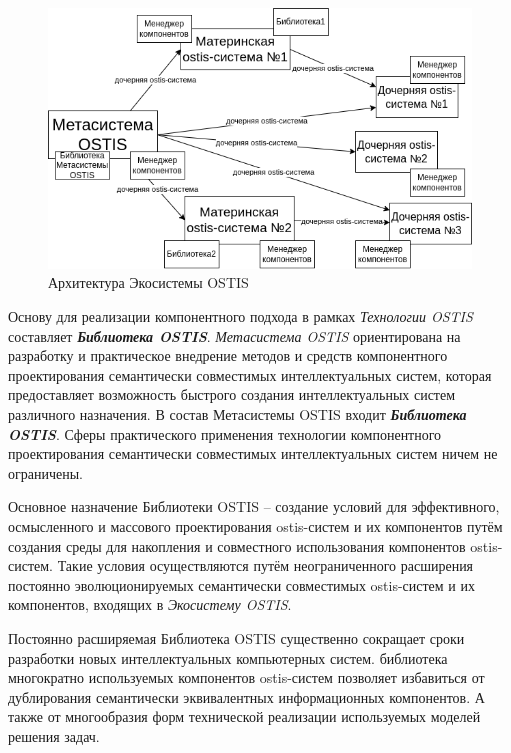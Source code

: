 \begin{figure}[H]
	\includegraphics[scale=0.8]{author/part5/figures/ecosystem_architecture.png}
	\caption{Архитектура Экосистемы OSTIS}
	\label{fig:ecosystem_architecture}
\end{figure}

Основу для реализации компонентного подхода в рамках \textit{Технологии OSTIS} составляет \textbf{\textit{Библиотека OSTIS}}. \textit{Метасистема OSTIS} ориентирована на разработку и практическое внедрение методов и средств компонентного проектирования семантически совместимых интеллектуальных систем, которая предоставляет возможность быстрого создания интеллектуальных систем различного назначения. В состав Метасистемы OSTIS входит \textbf{\textit{Библиотека OSTIS}}.
Сферы практического применения технологии компонентного проектирования семантически совместимых интеллектуальных систем ничем не ограничены.

Основное назначение Библиотеки OSTIS -- создание условий для эффективного, осмысленного и массового проектирования ostis-систем и их компонентов путём создания среды для накопления и совместного использования компонентов ostis-систем. Такие условия осуществляются путём неограниченного расширения постоянно эволюционируемых семантически совместимых ostis-систем и их компонентов, входящих в \textit{Экосистему OSTIS}.

Постоянно расширяемая Библиотека OSTIS существенно сокращает сроки разработки новых интеллектуальных компьютерных систем.
библиотека многократно используемых компонентов ostis-систем позволяет избавиться от дублирования семантически эквивалентных информационных компонентов. А также от многообразия форм технической реализации используемых моделей решения задач.

